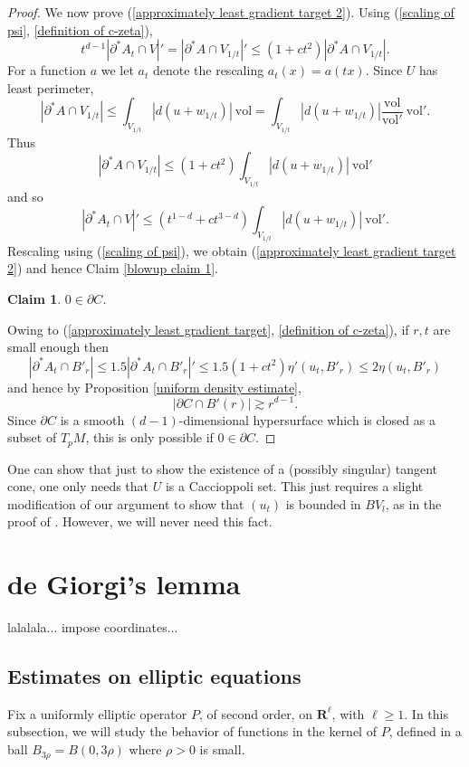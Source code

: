 \documentclass[reqno,12pt,letterpaper]{amsart}
\newcommand{\RR}{\mathbf{R}}
\newcommand{\vol}{\mathrm{vol}}
\newtheorem{claim}[theorem]{Claim}
\theoremstyle{definition}
\numberwithin{equation}{section}
\begin{document}
\begin{proof}
We now prove (\ref{approximately least gradient target 2}).
Using (\ref{scaling of psi}, \ref{definition of c-zeta}),
$$t^{d - 1} | \partial^* A_t \cap V|' = |\partial^* A \cap V_{1/t}|' \leq (1 + ct^2) |\partial^* A \cap V_{1/t}|.$$
For a function $a$ we let $a_t$ denote the rescaling $a_t(x) = a(tx)$.
Since $U$ has least perimeter,
$$|\partial^* A \cap V_{1/t}| \leq \int_{V_{1/t}} |d(u + w_{1/t})| ~\vol = \int_{V_{1/t}} |d(u + w_{1/t})| \frac{\vol}{\vol'} ~\vol'.$$
Thus
$$|\partial^* A \cap V_{1/t}| \leq (1 + ct^2) \int_{V_{1/t}} |d(u + w_{1/t})| ~\vol'$$
and so
$$|\partial^* A_t \cap V|' \leq (t^{1 - d} + ct^{3 - d}) \int_{V_{1/t}} |d(u + w_{1/t})| ~\vol'.$$
Rescaling using (\ref{scaling of psi}), we obtain (\ref{approximately least gradient target 2}) and hence Claim \ref{blowup claim 1}.

\begin{claim}
$0 \in \partial C$.
\end{claim}

Owing to (\ref{approximately least gradient target}, \ref{definition of c-zeta}), if $r,t$ are small enough then
$$|\partial^* A_t \cap B'_r| \leq 1.5|\partial^* A_t \cap B'_r|' \leq 1.5(1 + ct^2) \eta'(u_t, B'_r) \leq 2 \eta(u_t, B'_r)$$
and hence by Proposition \ref{uniform density estimate},
$$|\partial C \cap B'(r)| \gtrsim r^{d - 1}.$$
Since $\partial C$ is a smooth $(d-1)$-dimensional hypersurface which is closed as a subset of $T_pM$, this is only possible if $0 \in \partial C$.
\end{proof}

One can show that just to show the existence of a (possibly singular) tangent cone, one only needs that $U$ is a Caccioppoli set.
This just requires a slight modification of our argument to show that $(u_t)$ is bounded in $BV_l$, as in the proof of \cite[Theorem 9.3]{Giusti77}.
However, we will never need this fact.


\section{de Giorgi's lemma}
lalalala... impose coordinates...

\subsection{Estimates on elliptic equations}
Fix a uniformly elliptic operator $P$, of second order, on $\RR^\ell$, with $\ell \geq 1$.
In this subsection, we will study the behavior of functions in the kernel of $P$, defined in a ball $B_{3\rho} = B(0, 3\rho)$ where $\rho > 0$ is small.
\end{document}
